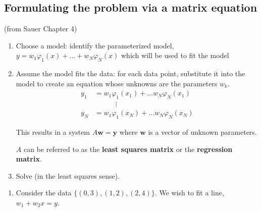 \documentclass[12pt,letterpaper,noanswers]{exam}
\newcommand{\vc}[1]{\boldsymbol{#1}}
\begin{document}
\subsection{Formulating the problem via a matrix equation}

\begin{tcolorbox}
(from Sauer Chapter 4)

\begin{enumerate}
    \item Choose a model: identify the parameterized model, $y = w_1\varphi_1(x) + ... + w_N\varphi_N(x)$ which will be used to fit the model
    \item Assume the model fits the data: for each data point, substitute it into the model to create an equation whose unknowns are the parameters $w_k$.  
    \begin{align*}
    y_1 &= w_1\varphi_1(x_1)+...w_N\varphi_N(x_1) \\
    & \quad\quad\quad\vdots \\
    y_N &= w_1\varphi_1(x_N)+...w_N\varphi_N(x_N)\end{align*}
    
    This results in a system $A\vc{w} = \vc{y}$ where $\vc{w}$ is a vector of unknown parameters.
    
    $A$ can be referred to as the \textbf{least squares matrix} or the \textbf{regression matrix}.
    \item Solve (in the least squares sense).
\end{enumerate}
\end{tcolorbox}

\begin{enumerate}[resume=classQ]
\item Consider the data $\{(0,3),(1,2),(2,4)\}$.  We wish to fit a line, $w_1 + w_2 x = y$.
\end{enumerate}
\end{document}
